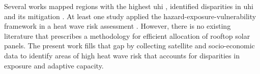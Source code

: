 Several works mapped regions with the highest \ac{uhi} \cite{almeida_study_2021},
identified disparities in \ac{uhi} \cite{chakraborty_disproportionately_2019} and
its mitigation \cite{reames_distributional_2020, mcdonald_tree_2021}. At least one
study applied the hazard-exposure-vulnerability framework in a heat wave risk
assessment \cite{maragno_mapping_2020}. However, there is no existing literature
that prescribes a methodology for efficient allocation of rooftop solar panels.
The present work fills that gap by collecting satellite and socio-economic data
to identify areas of high heat wave risk that accounts for disparities in
exposure and adaptive capacity.


%
%
%
%
